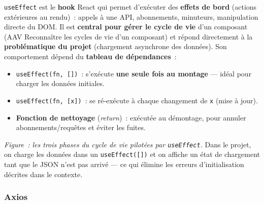 \noindent \texttt{useEffect} est le \textbf{hook} React qui permet d'exécuter des \textbf{effets de bord} (actions extérieures au rendu)~: appels à une API, abonnements, minuteurs, manipulation directe du DOM. Il est \textbf{central pour gérer le cycle de vie} d'un composant (AAV \og{}Reconnaître les cycles de vie d'un composant\fg{}) et répond directement à la \textbf{problématique du projet} (chargement asynchrone des données). Son comportement dépend du \textbf{tableau de dépendances}~:
\begin{itemize}
	\item \texttt{useEffect(fn, [])}~: s'exécute \textbf{une seule fois au montage} — idéal pour charger les données initiales.
	\item \texttt{useEffect(fn, [x])}~: se ré-exécute à chaque changement de \texttt{x} (mise à jour).
	\item \textbf{Fonction de nettoyage} (\textit{return})~: exécutée au démontage, pour annuler abonnements/requêtes et éviter les fuites.
\end{itemize}
\vspace{0.5cm}
\begin{center}
\end{center}
\noindent\textit{Figure~: les trois phases du cycle de vie pilotées par \texttt{useEffect}.} Dans le projet, on charge les données dans un \texttt{useEffect([])} et on affiche un état de chargement tant que le JSON n'est pas arrivé — ce qui élimine les erreurs d'initialisation décrites dans le contexte.

\subsubsection*{Axios}
{}

